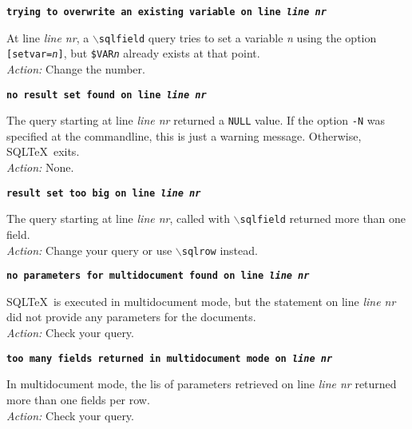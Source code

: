\documentclass{article}
\newcommand{\bs}{\ensuremath{\backslash}}
\newcommand{\vs}{\vspace{3mm}}
\begin{document}
\vs

\noindent\textbf{\texttt{trying to overwrite an existing variable on line \textit{line nr}}}

\vspace{1mm}

\noindent At line \textit{line nr}, a \texttt{\bs sqlfield} query tries to set a variable \textit{n}
using the option \texttt{[setvar=\textit{n}]}, but \texttt{\$VAR\textit{n}} already
exists at that point. \\
\textit{Action:} Change the number.

\vs

\noindent\textbf{\texttt{no result set found on line \textit{line nr}}}

\vspace{1mm}

\noindent The query starting at line \textit{line nr} returned a \texttt{NULL} value. If the
option \texttt{-N} was specified at the commandline, this is just a warning message.
Otherwise, SQL\TeX\ exits. \\
\textit{Action:} None.

\vs

\noindent\textbf{\texttt{result set too big on line \textit{line nr}}}

\vspace{1mm}

\noindent The query starting at line \textit{line nr}, called with \texttt{\bs sqlfield} returned more than one field. \\
\textit{Action:} Change your query or use \texttt{\bs sqlrow} instead.

\vs

\noindent\textbf{\texttt{no parameters for multidocument found on line \textit{line nr}}}

\vspace{1mm}

\noindent SQL\TeX\ is executed in multidocument mode, but the statement on line
\textit{line nr} did not provide any parameters for the documents. \\
\textit{Action:} Check your query.

\vs

\noindent\textbf{\texttt{too many fields returned in multidocument mode on \textit{line nr}}}

\vspace{1mm}

\noindent In multidocument mode, the lis of parameters retrieved on line
\textit{line nr} returned more than one fields per row. \\
\textit{Action:} Check your query.
\end{document}
